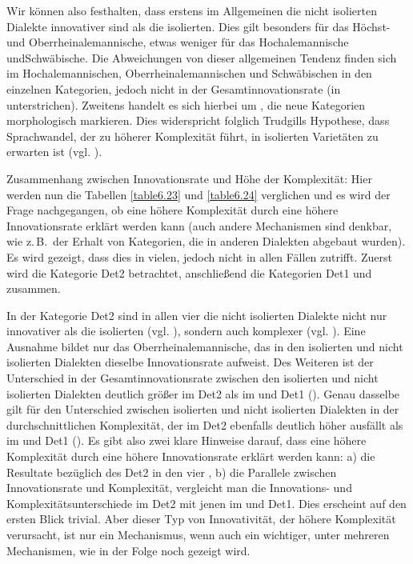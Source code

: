 Wir können also festhalten, dass erstens im Allgemeinen die nicht isolierten Dialekte innovativer sind als die isolierten. Dies gilt besonders für das Höchst- und Oberrheinalemannische, etwas weniger für das Hochalemannische und\linebreak Schwäbische. Die Abweichungen von dieser allgemeinen Tendenz finden sich im Hochalemannischen, Oberrheinalemannischen und Schwäbischen in den einzelnen Kategorien, jedoch nicht in der Gesamtinnovationsrate (in  unterstrichen). Zweitens handelt es sich hierbei um , die neue Kategorien morphologisch markieren. Dies widerspricht folglich Trudgills Hypothese, dass Sprachwandel, der zu höherer Komplexität führt, in isolierten Varietäten zu erwarten ist (vgl. ).

{Zusammenhang zwischen Innovationsrate und Höhe der Komplexität:} Hier werden nun die Tabellen \ref{table6.23} und \ref{table6.24} verglichen und es wird der Frage nachgegangen, ob eine höhere Komplexität durch eine höhere Innovationsrate erklärt werden kann (auch andere Mechanismen sind denkbar, wie z.\,B.\ der Erhalt von Kategorien, die in anderen Dialekten abgebaut wurden). Es wird gezeigt, dass dies in vielen, jedoch nicht in allen Fällen zutrifft. Zuerst wird die Kategorie Det2 betrachtet, anschließend die Kategorien Det1 und  zusammen.

In der Kategorie Det2 sind in allen vier  die nicht isolierten Dialekte nicht nur innovativer als die isolierten (vgl. ), sondern auch komplexer (vgl. ). Eine Ausnahme bildet nur das Oberrheinalemannische, das in den isolierten und nicht isolierten Dialekten dieselbe Innovationsrate aufweist. Des Weiteren ist der Unterschied in der Gesamtinnovationsrate zwischen den isolierten und nicht isolierten Dialekten deutlich größer im Det2 als im  und Det1 (). Genau dasselbe gilt für den Unterschied zwischen isolierten und nicht isolierten Dialekten in der durchschnittlichen Komplexität, der im Det2 ebenfalls deutlich höher ausfällt als im  und Det1 (). Es gibt also zwei klare Hinweise darauf, dass eine höhere Komplexität durch eine höhere Innovationsrate erklärt werden kann: a) die Resultate bezüglich des Det2 in den vier , b) die Parallele zwischen Innovationsrate und Komplexität, vergleicht man die Innovations- und Komplexitätsunterschiede im Det2 mit jenen im  und Det1. Dies erscheint auf den ersten Blick trivial. Aber dieser Typ von Innovativität, der höhere Komplexität verursacht, ist nur ein Mechanismus, wenn auch ein wichtiger, unter mehreren Mechanismen, wie in der Folge noch gezeigt wird.

